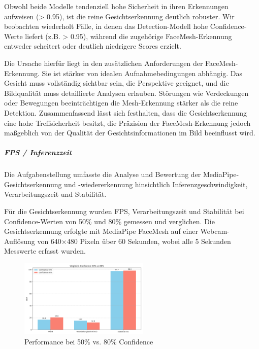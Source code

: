 Obwohl beide Modelle tendenziell hohe Sicherheit in ihren Erkennungen aufweisen (> 0.95), ist die reine Gesichtserkennung deutlich robuster. Wir beobachten wiederholt Fälle, in denen das Detection-Modell hohe Confidence-Werte liefert (z.B. > 0.95), während die zugehörige FaceMesh-Erkennung entweder scheitert oder deutlich niedrigere Scores erzielt.

Die Ursache hierfür liegt in den zusätzlichen Anforderungen der FaceMesh-Erkennung. Sie ist stärker von idealen Aufnahmebedingungen abhängig. Das Gesicht muss vollständig sichtbar sein, die Perspektive geeignet, und die Bildqualität muss detaillierte Analysen erlauben. 
Störungen wie Verdeckungen oder Bewegungen beeinträchtigen die Mesh-Erkennung stärker als die reine Detektion. Zusammenfassend lässt sich festhalten, dass die Gesichtserkennung eine hohe Treffsicherheit besitzt, die Präzision der FaceMesh-Erkennung jedoch maßgeblich von der Qualität der Gesichtsinformationen im Bild beeinflusst wird.

\subparagraph{FPS / Inferenzzeit} 

Die Aufgabenstellung umfasste die Analyse und Bewertung der MediaPipe-Gesichtserkennung und -wiedererkennung hinsichtlich Inferenzgeschwindigkeit, Verarbeitungszeit und Stabilität.

Für die Gesichtserkennung wurden FPS, Verarbeitungszeit und Stabilität bei Confidence-Werten von 50\% und 80\% gemessen und verglichen. Die Gesichtserkennung erfolgte mit MediaPipe FaceMesh auf einer Webcam-Auflösung von 640×480 Pixeln über 60 Sekunden, wobei alle 5 Sekunden Messwerte erfasst wurden.

\begin{figure}
[ht]
    \centering
    \includegraphics[width=0.55\textwidth]{data/Vergleich_Confidence_50_vs_80.png}
    \caption{Performance bei 50\% vs. 80\% Confidence}
    \label{fig:vergleich_confidence}
\end{figure}

